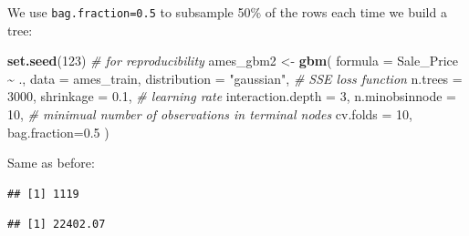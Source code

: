 \documentclass[
  10pt,
  ignorenonframetext,
]{beamer}
\newenvironment{Shaded}{\begin{snugshade}}{\end{snugshade}}
\newcommand{\AttributeTok}[1]{\textcolor[rgb]{0.13,0.29,0.53}{#1}}
\newcommand{\CommentTok}[1]{\textcolor[rgb]{0.56,0.35,0.01}{\textit{#1}}}
\newcommand{\DecValTok}[1]{\textcolor[rgb]{0.00,0.00,0.81}{#1}}
\newcommand{\FloatTok}[1]{\textcolor[rgb]{0.00,0.00,0.81}{#1}}
\newcommand{\FunctionTok}[1]{\textcolor[rgb]{0.13,0.29,0.53}{\textbf{#1}}}
\newcommand{\NormalTok}[1]{#1}
\newcommand{\OtherTok}[1]{\textcolor[rgb]{0.56,0.35,0.01}{#1}}
\newcommand{\SpecialCharTok}[1]{\textcolor[rgb]{0.81,0.36,0.00}{\textbf{#1}}}
\newcommand{\StringTok}[1]{\textcolor[rgb]{0.31,0.60,0.02}{#1}}
\begin{document}
\begin{frame}[fragile]
We use \texttt{bag.fraction=0.5} to subsample 50\% of the rows each time
we build a tree: \vspace{2mm}

\scriptsize

\begin{Shaded}
\begin{Highlighting}[]
\FunctionTok{set.seed}\NormalTok{(}\DecValTok{123}\NormalTok{)  }\CommentTok{\# for reproducibility}
\NormalTok{ames\_gbm2 }\OtherTok{\textless{}{-}} \FunctionTok{gbm}\NormalTok{(}
  \AttributeTok{formula =}\NormalTok{ Sale\_Price }\SpecialCharTok{\textasciitilde{}}\NormalTok{ .,}
  \AttributeTok{data =}\NormalTok{ ames\_train,}
  \AttributeTok{distribution =} \StringTok{"gaussian"}\NormalTok{,  }\CommentTok{\# SSE loss function}
  \AttributeTok{n.trees =} \DecValTok{3000}\NormalTok{,}
  \AttributeTok{shrinkage =} \FloatTok{0.1}\NormalTok{, }\CommentTok{\# learning rate}
  \AttributeTok{interaction.depth =} \DecValTok{3}\NormalTok{,}
  \AttributeTok{n.minobsinnode =} \DecValTok{10}\NormalTok{, }\CommentTok{\# minimual number of observations in terminal nodes}
  \AttributeTok{cv.folds =} \DecValTok{10}\NormalTok{,}
  \AttributeTok{bag.fraction=}\FloatTok{0.5}
\NormalTok{)}
\end{Highlighting}
\end{Shaded}

\normalsize

Same as before:

\vspace{2mm}

\scriptsize

\begin{Shaded}
\end{Shaded}

\begin{verbatim}
## [1] 1119
\end{verbatim}

\begin{Shaded}
\end{Shaded}

\begin{verbatim}
## [1] 22402.07
\end{verbatim}
\end{frame}
\end{document}
